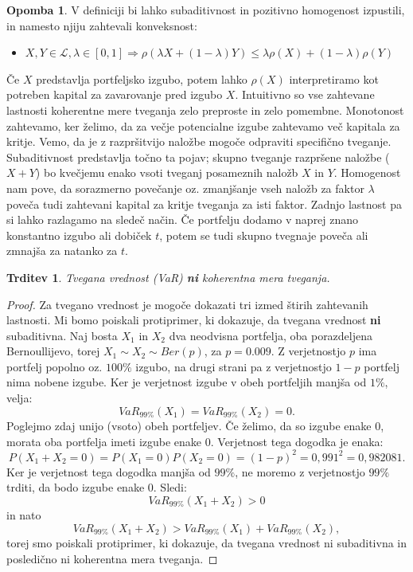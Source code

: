 \documentclass[12pt,a4paper]{amsart}
\theoremstyle{definition} %
\newtheorem{opomba}[definicija]{Opomba}
\theoremstyle{plain} %
\newtheorem{trditev}[definicija]{Trditev}
\begin{document}
\begin{opomba}
	V definiciji bi lahko subaditivnost in pozitivno homogenost izpustili, in namesto 
	njiju zahtevali konveksnost:
	\begin{itemize}
		\item $X,Y \in \mathcal{L}, \lambda \in [0, 1] \Rightarrow \rho(\lambda X + (1-\lambda) Y) \leq \lambda \rho(X) + (1 - \lambda) \rho(Y)$
	\end{itemize}
\end{opomba}


Če $X$ predstavlja portfeljsko izgubo, potem lahko $\rho(X)$ interpretiramo kot
potreben kapital za zavarovanje pred izgubo $X$. Intuitivno so vse zahtevane 
lastnosti koherentne mere tveganja zelo preproste in zelo pomembne. Monotonost
zahtevamo, ker želimo, da za večje potencialne izgube zahtevamo več kapitala za 
kritje. 
Vemo, da je z razpršitvijo naložbe mogoče odpraviti specifično tveganje. Subaditivnost
predstavlja točno ta pojav; skupno tveganje razpršene naložbe ($X + Y$) bo kvečjemu
enako vsoti tveganj posameznih naložb $X$ in $Y$.
Homogenost nam pove, da sorazmerno povečanje oz. zmanjšanje vseh naložb za
faktor $\lambda$ poveča tudi zahtevani kapital za kritje tveganja za isti faktor. Zadnjo 
lastnost pa si lahko razlagamo na sledeč način. Če portfelju dodamo v  naprej znano 
konstantno izgubo ali dobiček $t$, potem se tudi skupno tvegnaje poveča ali zmnajša za
natanko za $t$.

\begin{trditev}
Tvegana vrednost (\textit{VaR}) \textbf{ni} koherentna mera tveganja.
\end{trditev}

\begin{proof}
Za tvegano vrednost je mogoče dokazati tri izmed štirih zahtevanih lastnosti.
Mi bomo poiskali protiprimer, ki dokazuje, da tvegana vrednost \textbf{ni}
subaditivna.
Naj bosta $X_1$ in $X_2$ dva neodvisna portfelja, oba porazdeljena Bernoullijevo, torej  $X_1 \sim X_2 \sim Ber(p)$, 
za $p = 0.009$. Z verjetnostjo $p$ ima portfelj popolno oz. $100\%$ izgubo, 
na drugi strani pa z verjetnostjo $1-p$ portfelj nima nobene izgube. 
Ker je verjetnost izgube v obeh portfeljih manjša od $1\%$, velja:
$$VaR_{99\%}(X_1) = VaR_{99\%}(X_2) = 0.$$
Poglejmo zdaj unijo (vsoto) obeh portfeljev. Če želimo, da so izgube enake $0$,
morata oba portfelja imeti izgube enake $0$. Verjetnost tega dogodka je enaka:
$$P(X_1 + X_2 = 0) = P(X_1 = 0)P(X_2 = 0) = (1-p)^2 = 0,991^2 = 0,982081.$$
Ker je verjetnost tega dogodka manjša od $99\%$, ne moremo z verjetnostjo $99\%$
trditi, da bodo izgube enake $0$. Sledi:
$$VaR_{99\%}(X_1 + X_2) > 0$$
in nato
$$VaR_{99\%}(X_1 + X_2) > VaR_{99\%}(X_1) + VaR_{99\%}(X_2),$$
torej smo poiskali protiprimer, ki dokazuje, da tvegana vrednost ni subaditivna
in posledično ni koherentna mera tveganja.
\end{proof}
\end{document}

